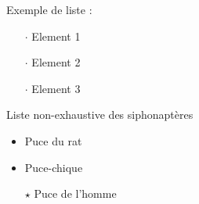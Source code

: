 Exemple de liste :
\begin{itemize}
\item[$\cdot$] Element 1
\item[$\cdot$] Element 2
\item[$\cdot$] Element 3
\end{itemize}
Liste non-exhaustive des siphonaptères 
\begin{itemize}[label=$\cdot$]	%
\item Puce du rat
\item Puce-chique
\item[$\star$] Puce de l'homme 	%
\end{itemize}
